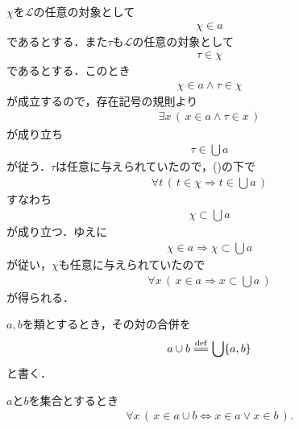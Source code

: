 	\begin{sketch}
		$\chi$を$\mathcal{L}$の任意の対象として
		\begin{align}
			\chi \in a
			\label{fom:thm_union_is_bigger_than_any_member_1}
		\end{align}
		であるとする．また$\tau$も$\mathcal{L}$の任意の対象として
		\begin{align}
			\tau \in \chi
		\end{align}
		であるとする．このとき
		\begin{align}
			\chi \in a \wedge \tau \in \chi
		\end{align}
		が成立するので，存在記号の規則より
		\begin{align}
			\exists x\, \left(\, x \in a \wedge \tau \in x\, \right)
		\end{align}
		が成り立ち
		\begin{align}
			\tau \in \bigcup a
		\end{align}
		が従う．$\tau$は任意に与えられていたので，()の下で
		\begin{align}
			\forall t\, (\, t \in \chi \Longrightarrow t \in \bigcup a\, )
		\end{align}
		すなわち
		\begin{align}
			\chi \subset \bigcup a
		\end{align}
		が成り立つ．ゆえに
		\begin{align}
			\chi \in a \Longrightarrow \chi \subset \bigcup a
		\end{align}
		が従い，$\chi$も任意に与えられていたので
		\begin{align}
			\forall x\, (\, x \in a \Longrightarrow x \subset \bigcup a\, )
		\end{align}
		が得られる．
		\QED
	\end{sketch}
	
	$a,b$を類とするとき，その対の合併を
	\begin{align}
		a \cup b \defeq \bigcup \{a,b\}
	\end{align}
	と書く．
	
	\begin{screen}
		\begin{thm}
			$a$と$b$を集合とするとき
			\begin{align}
				\forall x\, (\, x \in a \cup b \Longleftrightarrow x \in a \vee x \in b\, ).
			\end{align}
		\end{thm}
	\end{screen}
	
